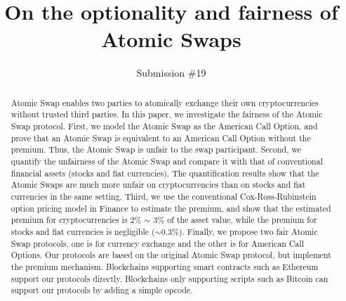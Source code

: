 \documentclass[sigconf, natbib=false]{acmart}
\renewcommand\_{\textunderscore\allowbreak}
\begin{document}
\title{On the optionality and fairness of Atomic Swaps}
\author{Submission \#19}


\begin{abstract}
Atomic Swap enables two parties to atomically exchange their own cryptocurrencies without trusted third parties.
In this paper, we investigate the fairness of the Atomic Swap protocol.
First, we model the Atomic Swap as the American Call Option,
and prove that an Atomic Swap is equivalent to an American Call Option without the premium.
Thus, the Atomic Swap is unfair to the swap participant.
Second, we quantify the unfairness of the Atomic Swap and compare it with that of conventional financial assets (stocks and fiat currencies).
The quantification results show that the Atomic Swaps are much more unfair on cryptocurrencies than on stocks and fiat currencies in the same setting.
Third, we use the conventional Cox-Ross-Rubinstein option pricing model in Finance to estimate the premium, and show that the estimated premium for cryptocurrencies is 2\% $\sim$ 3\% of the asset value, while the premium for stocks and fiat currencies is negligible ($\sim 0.3\%$).
Finally, we propose two fair Atomic Swap protocols,
one is for currency exchange and the other is for American Call Options.
Our protocols are based on the original Atomic Swap protocol, but implement the premium mechanism.
Blockchains supporting smart contracts such as Ethereum support our protocols directly.
Blockchains only supporting scripts such as Bitcoin can support our protocols by adding a simple opcode.
\end{abstract}


\maketitle














\printbibliography


\end{document}

